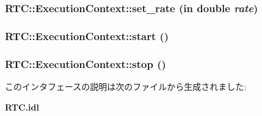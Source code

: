 \subsubsection[{set\_\-rate}]{ RTC::ExecutionContext::set\_\-rate (in double {\em rate})}\label{interfaceRTC_1_1ExecutionContext_ae6bdf760ff071970f9ed9e0a9d6fe459}
\subsubsection[{start}]{ RTC::ExecutionContext::start ()}\label{interfaceRTC_1_1ExecutionContext_ab015ee47c132e0cf223459d2db7b9f94}
\subsubsection[{stop}]{ RTC::ExecutionContext::stop ()}\label{interfaceRTC_1_1ExecutionContext_afe216bae26d5817459a67e5b7e3134ce}


このインタフェースの説明は次のファイルから生成されました:\begin{DoxyCompactItemize}
\item 
{\bf RTC.idl}\end{DoxyCompactItemize}

